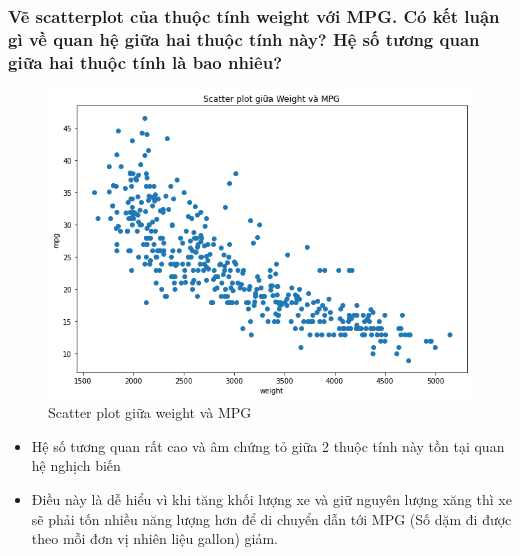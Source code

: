 \documentclass[a4paper, 12pt]{article}
\begin{document}
    \subsubsection{Vẽ scatterplot của thuộc tính weight với MPG. Có kết luận gì về quan hệ giữa hai thuộc tính này? Hệ số tương quan giữa hai thuộc tính là bao nhiêu?}
        \begin{figure}[H]
            \centering
                \includegraphics[scale=0.8]{img/weight-mpg.png}
                \caption{Scatter plot giữa weight và MPG}
        \end{figure}
        
        \begin{itemize}
            \item Hệ số tương quan rất cao và âm chứng tỏ giữa 2 thuộc tính này tồn tại quan hệ nghịch biến
            \item Điều này là dễ hiểu vì khi tăng khối lượng xe và giữ nguyên lượng xăng thì xe sẽ phải tốn nhiều năng lượng hơn để di chuyển dẫn tới MPG (Số dặm đi được theo mỗi đơn vị nhiên liệu gallon) giảm.
        \end{itemize}
\end{document}
